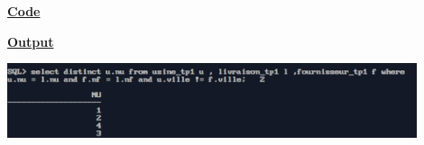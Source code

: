 \newpage
{}

\textbf{\underline{Code}}


\vspace{1cm}
\textbf{\underline{Output}}
\vspace{1cm}
\begin{center}
    \includegraphics[width=0.9\textwidth]{Questions/q20/q20.png}
\end{center}


